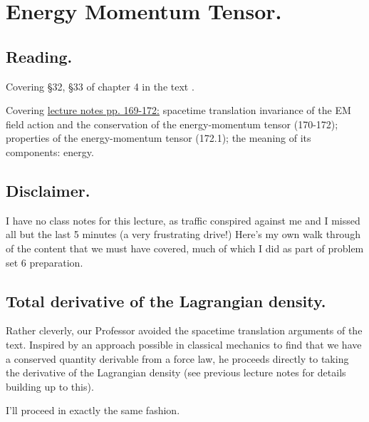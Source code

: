 %
%

\chapter{Energy Momentum Tensor.}
\label{chap:relativisticElectrodynamicsL22}
{}
\date{Mar 23, 2011}

\beginArtNoToc

\section{Reading.}

Covering \S 32, \S 33 of chapter 4 in the text \cite{landau1980classical}.

Covering \href{http://www.physics.utoronto.ca/~poppitz/epoppitz/PHY450_files/RelEMpp166-180.pdf}{lecture notes pp. 169-172:} spacetime translation invariance of the EM field action and the conservation of the energy-momentum tensor (170-172); properties of the energy-momentum tensor (172.1); the meaning of its components: energy.

\section{Disclaimer.}

I have no class notes for this lecture, as traffic conspired against me and I missed all but the last 5 minutes (a very frustrating drive!)  Here's my own walk through of the content that we must have covered, much of which I did as part of problem set 6 preparation.

\section{Total derivative of the Lagrangian density.}

Rather cleverly, our Professor avoided the spacetime translation arguments of the text.  Inspired by an approach possible in classical mechanics to find that we have a conserved quantity derivable from a force law, he proceeds directly to taking the derivative of the Lagrangian density (see previous lecture notes for details building up to this).

I'll proceed in exactly the same fashion.

